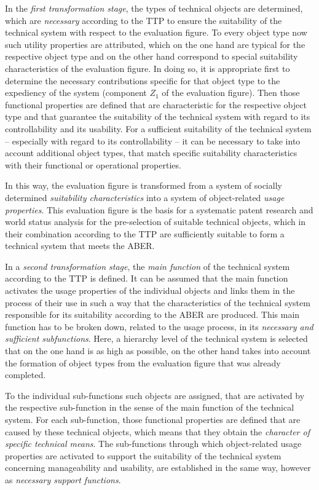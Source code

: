 \documentclass[11pt,a4paper]{article}
\begin{document}
In the \emph{first transformation stage}, the types of technical objects are
determined, which are \emph{necessary} according to the TTP to ensure the
suitability of the technical system with respect to the evaluation figure.  To
every object type now such utility properties are attributed, which on the one
hand are typical for the respective object type and on the other hand
correspond to special suitability characteristics of the evaluation figure. In
doing so, it is appropriate first to determine the necessary contributions
specific for that object type to the expediency of the system (component $Z_1$
of the evaluation figure). Then those functional properties are defined that
are characteristic for the respective object type and that guarantee the
suitability of the technical system with regard to its controllability and its
usability. For a sufficient suitability of the technical system -- especially
with regard to its controllability -- it can be necessary to take into account
additional object types, that match specific suitability characteristics with
their functional or operational properties.

In this way, the evaluation figure is transformed from a system of socially
determined \emph{suitability characteristics} into a system of object-related
\emph{usage properties}. This evaluation figure is the basis for a systematic
patent research and world status analysis for the pre-selection of suitable
technical objects, which in their combination according to the TTP are
sufficiently suitable to form a technical system that meets the ABER.

In a \emph{second transformation stage}, the \emph{main function} of the
technical system according to the TTP is defined. It can be assumed that the
main function activates the usage properties of the individual objects and
links them in the process of their use in such a way that the characteristics
of the technical system responsible for its suitability according to the ABER
are produced.  This main function has to be broken down, related to the usage
process, in its \emph{necessary and sufficient subfunctions}. Here, a
hierarchy level of the technical system is selected that on the one hand is as
high as possible, on the other hand takes into account the formation of object
types from the evaluation figure that was already completed.

To the individual sub-functions such objects are assigned, that are activated
by the respective sub-function in the sense of the main function of the
technical system. For each sub-function, those functional properties are
defined that are caused by these technical objects, which means that they
obtain the \emph{character of specific technical means}. The sub-functions
through which object-related usage properties are activated to support the
suitability of the technical system concerning manageability and usability,
are established in the same way, however as \emph{necessary support
  functions}.
\end{document}
